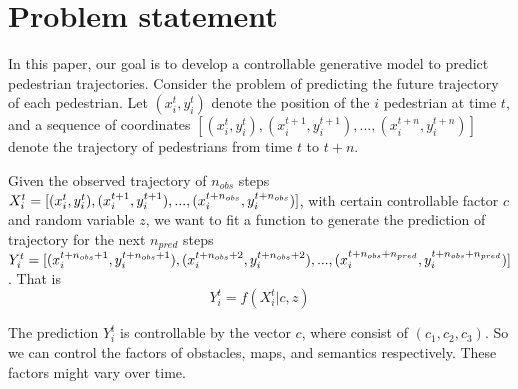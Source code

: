 \documentclass[sigconf]{acmart}
\begin{document}
\section{Problem statement}

In this paper, our goal is to develop a controllable generative model to predict pedestrian trajectories.
Consider the problem of predicting the future trajectory of each pedestrian. Let $(x_i^t, y_i^t)$ denote the position of the $i$ pedestrian at time $t$, and a sequence of coordinates  $[(x_i^{t}, y_i^{t}), (x_i^{t+1}, y_i^{t+1}), ..., (x_i^{t+n}, y_i^{t+n})]$ denote the trajectory of pedestrians from time $t$ to $t+n$.

Given the observed trajectory of $n_{obs}$ steps $X_i^t = [(x_i^{t}, y_i^{t}), \\ (x_i^{t+1}, y_i^{t+1}), ..., (x_i^{t+n_{obs}}, y_i^{t+n_{obs}})]$, with certain controllable factor $c$ and random variable $z$,  we want to fit a function to generate the prediction of trajectory for the next $n_{pred}$ steps $Y_i^t = [(x_i^{t+n_{obs}+1}, y_i^{t+n_{obs}+1}), \\ (x_i^{t+n_{obs}+ 2}, y_i^{t+n_{obs}+2}), ...,  (x_i^{t+n_{obs}+ n_{pred}}, y_i^{t+n_{obs}+n_{pred}})]$. That is
$$ Y_i^t = f(X_i^t \vert c, z) $$

The prediction $Y_i^t$ is controllable by the vector $c$, where consist of $(c_1, c_2, c_3)$. So we can control the factors of obstacles, maps, and semantics respectively. These factors might vary over time.




\end{document}
